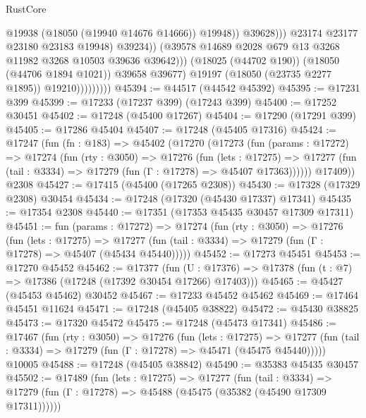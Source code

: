 \begin{lexlean}{RustCore}
\begin{coremodule}
                                            @19938
                                            (@18050 (@19940 @14676 @14666))
                                            @19948))
                                        @39628)))
                                  @23174
                                  @23177
                                  @23180
                                  @23183
                                  @19948)
                                @39234))
                            (@39578 @14689 @2028 @679 @13 @3268 @11982 @3268 @10503 @39636 @39642)))
                        (@18025 (@44702 @190))
                        (@18050 (@44706 @1894 @1021))
                        @39658
                        @39677)
                      @19197
                      (@18050 (@23735 @2277 @1895))
                      @19210)))))))))
@45394 := @44517 (@44542 @45392)
@45395 := @17231 @399
@45399 := @17233 (@17237 @399) (@17243 @399)
@45400 := @17252 @30451
@45402 := @17248 (@45400 @17267)
@45404 := @17290 (@17291 @399)
@45405 := @17286 @45404
@45407 := @17248 (@45405 @17316)
@45424 := @17247
    (fun (fn : @183) =>
    @45402
      (@17270
        (@17273
          (fun (params : @17272) =>
          @17274
            (fun (rty : @3050) =>
            @17276
              (fun (lets : @17275) =>
              @17277 (fun (tail : @3334) => @17279 (fun (Γ : @17278) => @45407 @17363))))))
        @17409))
    @2308
@45427 := @17415 (@45400 (@17265 @2308))
@45430 := @17328 (@17329 @2308) @30454
@45434 := @17248 (@17320 (@45430 @17337) @17341)
@45435 := @17354 @2308
@45440 := @17351 (@17353 @45435 @30457 @17309 @17311)
@45451 := fun (params : @17272) =>
  @17274
    (fun (rty : @3050) =>
    @17276
      (fun (lets : @17275) =>
      @17277 (fun (tail : @3334) => @17279 (fun (Γ : @17278) => @45407 (@45434 @45440)))))
@45452 := @17273 @45451
@45453 := @17270 @45452
@45462 := @17377
    (fun (U : @17376) => @17378 (fun (t : @7) => @17386 (@17248 (@17392 @30454 @17266) @17403)))
@45465 := @45427 (@45453 @45462) @30452
@45467 := @17233 @45452 @45462
@45469 := @17464 @45451 @11624
@45471 := @17248 (@45405 @38822)
@45472 := @45430 @38825
@45473 := @17320 @45472
@45475 := @17248 (@45473 @17341)
@45486 := @17467
    (fun (rty : @3050) =>
    @17276
      (fun (lets : @17275) =>
      @17277 (fun (tail : @3334) => @17279 (fun (Γ : @17278) => @45471 (@45475 @45440)))))
    @10005
@45488 := @17248 (@45405 @38842)
@45490 := @35383 @45435 @30457
@45502 := @17489
    (fun (lets : @17275) =>
    @17277
      (fun (tail : @3334) =>
      @17279 (fun (Γ : @17278) => @45488 (@45475 (@35382 (@45490 @17309 @17311))))))

\end{coremodule}
\end{lexlean}
